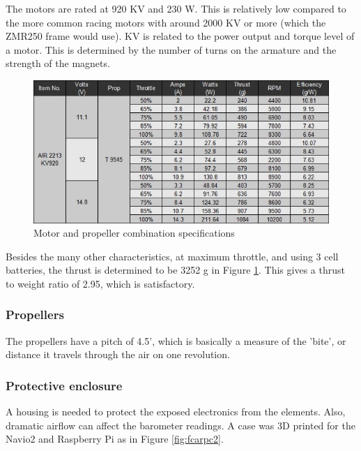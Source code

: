 The motors are rated at 920 KV and 230 W. This is relatively low compared to the more common racing motors with around 2000 KV or more (which the ZMR250 frame would use). KV is related to the power output and torque level of a motor. This is determined by the number of turns on the armature and the strength of the magnets.\\

\begin{figure}[H]
\centering
\includegraphics[scale=0.4]{images/motor_specs.jpg}
\caption{Motor and propeller combination specifications \cite{frobot}}
\label{fig:mot_prop_specs}
\end{figure}

Besides the many other characteristics, at maximum throttle, and using 3 cell batteries, the thrust is determined to be 3252 g in Figure \ref{fig:mot_prop_specs}. This gives a thrust to weight ratio of 2.95, which is satisfactory.

\subsubsection{Propellers}

The propellers have a pitch of 4.5', which is basically a measure of the 'bite', or distance it travels through the air on one revolution.

\subsubsection{Protective enclosure}

A housing is needed to protect the exposed electronics from the elements. Also, dramatic airflow can affect the barometer readings. A case \cite{3d_case} was 3D printed for the Navio2 and Raspberry Pi as in Figure \ref{fig:fcarpc2}.

